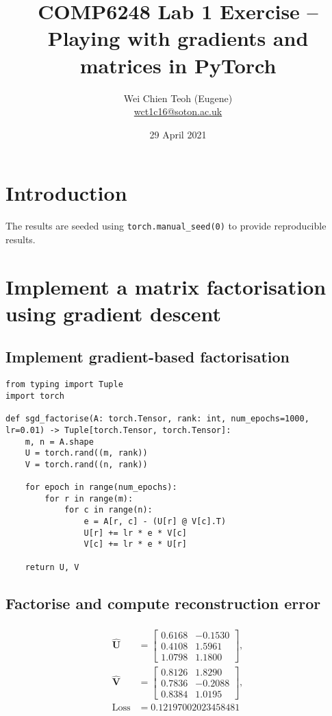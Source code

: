 \documentclass[10pt, twocolumn]{article}
\title{\Large COMP6248 Lab 1 Exercise -- Playing with gradients and matrices in PyTorch}
\author{\small Wei Chien Teoh (Eugene)\\\bigskip \href{mailto:wct1c16@soton.ac.uk}{wct1c16@soton.ac.uk}}
\date{\small 29 April 2021}
\begin{document}
\maketitle

\section*{Introduction}

The results are seeded using \lstinline{torch.manual_seed(0)} to provide reproducible results.

\section{Implement a matrix factorisation using gradient descent}

\subsection{Implement gradient-based factorisation}

\begin{lstlisting}
from typing import Tuple
import torch

def sgd_factorise(A: torch.Tensor, rank: int, num_epochs=1000, lr=0.01) -> Tuple[torch.Tensor, torch.Tensor]:
    m, n = A.shape
    U = torch.rand((m, rank))
    V = torch.rand((n, rank)) 

    for epoch in range(num_epochs):
        for r in range(m):
            for c in range(n):
                e = A[r, c] - (U[r] @ V[c].T)
                U[r] += lr * e * V[c]
                V[c] += lr * e * U[r]

    return U, V
\end{lstlisting}

\subsection{Factorise and compute reconstruction error} \label{sec:reconstruction}

\begin{align*}
    \begin{split}
    \hat{\pmb{U}} &= 
    \begin{bmatrix}
        0.6168 & -0.1530\\
        0.4108 &  1.5961\\
        1.0798 &  1.1800
    \end{bmatrix},\\
    \hat{\pmb{V}} &= 
    \begin{bmatrix}
        0.8126 &  1.8290\\
        0.7836 & -0.2088\\
        0.8384 & 1.0195
    \end{bmatrix},\\
    \text{Loss} &= 0.12197002023458481
    \end{split}
\end{align*}
\end{document}
